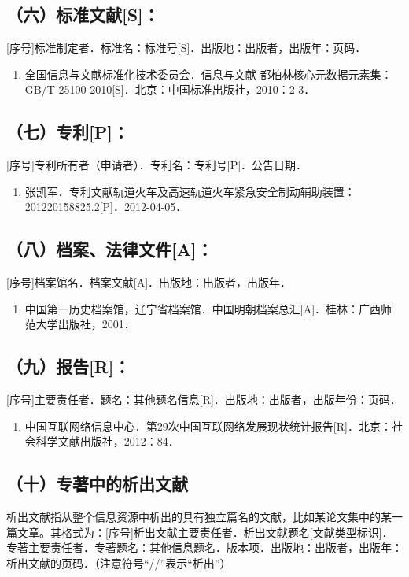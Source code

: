 \subsection{（六）标准文献[S]：}
[序号]标准制定者．标准名：标准号[S]．出版地：出版者，出版年：页码．

\begin{enumerate}
\item[1] 全国信息与文献标准化技术委员会．信息与文献 都柏林核心元数据元素集：GB/T 25100-2010[S]．北京：中国标准出版社，2010：2-3．
\end{enumerate}

\subsection{（七）专利[P]：}
[序号]专利所有者（申请者）．专利名：专利号[P]．公告日期．

\begin{enumerate}
\item[1] 张凯军．专利文献轨道火车及高速轨道火车紧急安全制动辅助装置：201220158825.2[P]．2012-04-05．
\end{enumerate}

\subsection{（八）档案、法律文件[A]：}
[序号]档案馆名．档案文献[A]．出版地：出版者，出版年．

\begin{enumerate}
\item[1] 中国第一历史档案馆，辽宁省档案馆．中国明朝档案总汇[A]．桂林：广西师范大学出版社，2001．
\end{enumerate}

\subsection{（九）报告[R]：}
[序号]主要责任者．题名：其他题名信息[R]．出版地：出版者，出版年份：页码．

\begin{enumerate}
\item[1] 中国互联网络信息中心．第29次中国互联网络发展现状统计报告[R]．北京：社会科学文献出版社，2012：84．
\end{enumerate}

\subsection{（十）专著中的析出文献}
析出文献指从整个信息资源中析出的具有独立篇名的文献，比如某论文集中的某一篇文章。其格式为：[序号]析出文献主要责任者．析出文献题名[文献类型标识]．专著主要责任者．专著题名：其他信息题名．版本项．出版地：出版者，出版年：析出文献的页码．（注意符号“//”表示“析出”）

